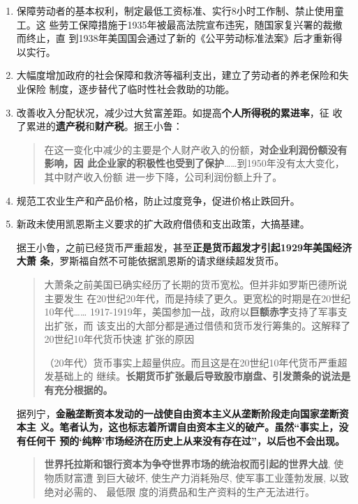 \begin{enumerate}
\item 保障劳动者的基本权利，制定最低工资标准、实行8小时工作制、禁止使用童工。这
  些劳工保障措施于1935年被最高法院宣布违宪，随国家复兴署的裁撤而终止，直
  到1938年美国国会通过了新的《公平劳动标准法案》后才重新得以实行。

\item 大幅度增加政府的社会保障和救济等福利支出，建立了劳动者的养老保险和失业保险
  制度，逐步替代了临时性社会救助的功能。

\item 改善收入分配状况，减少过大贫富差距。如提高\textbf{个人所得税的累进率}，征
  收了累进的\textbf{遗产税}和\textbf{财产税}。据王小鲁：
  \begin{quotation}
    在这一变化中减少的主要是个人财产收入的份额，\textbf{对企业利润份额没有影响，因
      此企业家的积极性也受到了保护}……到1950年没有太大变化，其中财产收入份额
    进一步下降，公司利润份额上升了。
\end{quotation}

\item 规范工农业生产和产品价格，防止过度竞争，促进价格止跌回升。

\item 新政未使用凯恩斯主义要求的扩大政府借债和支出政策，大搞基建。

  据王小鲁，之前已经货币严重超发，甚至\textbf{正是货币超发才引起1929年美国经济大萧
    条}，罗斯福自然不可能依据凯恩斯的请求继续超发货币。
  \begin{quotation}
    大萧条之前美国已确实经历了长期的货币宽松。但并非如罗斯巴德所说主要发生
    在20世纪20年代，而是持续了更久。更宽松的时期是在20世纪10年代……
    1917-1919年，美国参加一战，政府以\textbf{巨额赤字}支持了军事支出扩张，而
    该支出的大部分都是通过借债和货币发行筹集的。这解释了20世纪10年代货币快速
    扩张的原因

    （20年代）货币事实上超量供应。而且这是在20世纪10年代货币严重超发基础上的
    继续。\textbf{长期货币扩张最后导致股市崩盘、引发萧条的说法是有充分根据的。}
  \end{quotation}

  据列宁，\textbf{金融垄断资本发动的一战使自由资本主义从垄断阶段走向国家垄断资本主
    义。笔者认为，这也标志着所谓自由资本主义的破产。虽然“事实上，没有任何干
    预的‘纯粹’市场经济在历史上从来没有存在过”，以后也不会出现。}
  \begin{quotation}
    \textbf{世界托拉斯和银行资本为争夺世界市场的统治权而引起的世界大战}, 使物质财富遭
    到巨大破坏, 使生产力消耗殆尽, 使军事工业蓬勃发展, 以致绝对必需的、 最低限
    度的消费品和生产资料的生产无法进行。


\end{quotation}
\end{enumerate}
